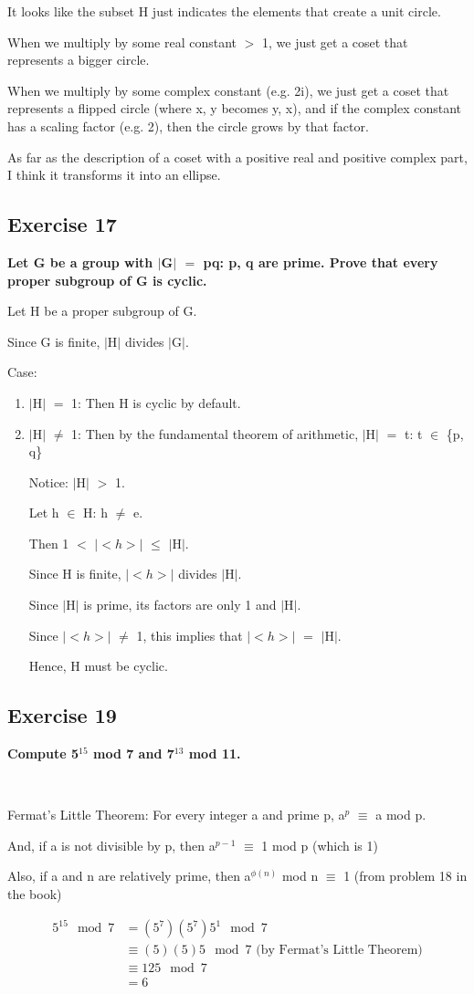 \documentclass{article}
\newcommand{\mt}[1]{\ensuremath{#1}}
\newcommand\ssc[2][\DefaultOpt]{%
  \def\DefaultOpt{#2}%
  \subsection[#1]{#2}%
}
\newcommand{\elist}{\end{enumerate}}
\newcommand{\bilist}{\begin{enumerate}[label=\roman*)]}
\newcommand{\mem}{\mt{\in} }
\newcommand{\av}[1]{\mt{|}#1\mt{|}}  %
\newcommand{\bk}[1]{\{#1\}}
\newcommand{\ls}{\mt{<} }
\newcommand{\gr}{\mt{>} }
\newcommand{\lse}{\mt{\leq} }
\newcommand{\eql}{\mt{=} }
\newcommand{\uf}[2]{#1\mt{^{#2}}}
\newcommand{\eqn}[1]{\[#1\]}
\newcommand{\splt}[1]{\begin{split}#1\end{split}}
\begin{document}
{{It looks like the subset H just indicates the elements that create a unit circle.

When we multiply by some real constant \gr 1, we just get a coset that represents a bigger circle.

When we multiply by some complex constant (e.g. 2i), we just get a coset that represents a flipped circle (where x, y becomes y, x), and if the complex constant has a scaling factor (e.g. 2), then the circle grows by that factor.

As far as the description of a coset with a positive real and positive complex part, I think it transforms it into an ellipse.


}
\ssc{Exercise 17}{

\textbf{Let G be a group with \av{G} \eql pq: p, q are prime. Prove that every proper subgroup of G is cyclic.}

Let H be a proper subgroup of G.

Since G is finite, \av{H} divides \av{G}.

Case:
\bilist
\item \av{H} \eql 1: Then H is cyclic by default.
\item \av{H} $\neq$ 1: Then by the fundamental theorem of arithmetic, \av{H} \eql t: t \mem \bk{p, q}

Notice: \av{H} \gr 1.

Let h \mem H: h $\neq$ e.

Then 1 \ls \av{$<h>$} \lse \av{H}.

Since H is finite, \av{$<h>$} divides \av{H}.

Since \av{H} is prime, its factors are only 1 and \av{H}. 

Since \av{$<h>$} $\neq$ 1, this implies that \av{$<h>$} \eql \av{H}.

Hence, H must be cyclic.

\elist

}
\ssc{Exercise 19}{

\textbf{Compute \uf{5}{15} mod 7 and \uf{7}{13} mod 11.}

\

Fermat's Little Theorem: For every integer a and prime p, \uf{a}{p} $\equiv$ a mod p.

And, if a is not divisible by p, then \uf{a}{p - 1} $\equiv$ 1 mod p (which is 1)

Also, if a and n are relatively prime, then \uf{a}{\phi(n)} mod n $\equiv$ 1 (from problem 18 in the book)

\eqn{
	\splt{
		5^{15}\mod 7 & \eql (5^7)(5^7)5^1 \mod 7 \\
		& \equiv (5)(5)5 \mod 7 \textrm{ (by Fermat's Little Theorem)} \\
		& \equiv 125 \mod 7 \\
		& = 6
	}
}

}}
\end{document}
